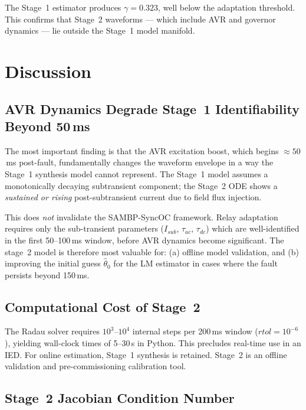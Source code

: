 \documentclass[12pt,a4paper]{article}
\theoremstyle{definition}
\theoremstyle{plain}
\begin{document}
The Stage~1 estimator produces $\gamma = 0.323$, well below the adaptation
threshold.  This confirms that Stage~2 waveforms — which include AVR and
governor dynamics — lie outside the Stage~1 model manifold.

\section{Discussion}
\label{sec:disc}

\subsection{AVR Dynamics Degrade Stage~1 Identifiability Beyond 50\,ms}
\label{sec:disc:avr}

The most important finding is that the AVR excitation boost, which begins
$\approx 50$\,ms post-fault, fundamentally changes the waveform envelope
in a way the Stage~1 synthesis model cannot represent.  The Stage~1 model
assumes a monotonically decaying subtransient component; the Stage~2 ODE
shows a \emph{sustained or rising} post-subtransient current due to field
flux injection.

This does \emph{not} invalidate the SAMBP-SyncOC framework.  Relay adaptation
requires only the sub-transient parameters ($I_{sub}$, $\tau_{ac}$, $\tau_{dc}$)
which are well-identified in the first 50--100\,ms window, before AVR dynamics
become significant.  The stage~2 model is therefore most valuable for:
(a) offline model validation, and (b) improving the initial guess $\hat{\theta}_0$
for the LM estimator in cases where the fault persists beyond 150\,ms.

\subsection{Computational Cost of Stage~2}
\label{sec:disc:cost}

The Radau solver requires $10^3$--$10^4$ internal steps per 200\,ms window
($rtol = 10^{-6}$), yielding wall-clock times of 5--30\,s in Python.
This precludes real-time use in an IED.  For online estimation, Stage~1
synthesis is retained.  Stage~2 is an offline validation and pre-commissioning
calibration tool.

\subsection{Stage~2 Jacobian Condition Number}
\label{sec:disc:kappastage2}
\end{document}
